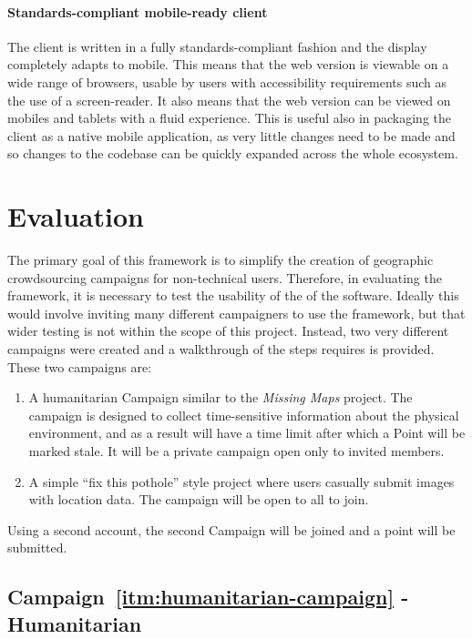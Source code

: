\documentclass{article}
\newcommand\ssection{\clearpage\section}
\begin{document}
	\paragraph{Standards-compliant mobile-ready client}
	The client is written in a fully standards-compliant fashion and the display completely adapts to mobile. This means that the web version is viewable on a wide range of browsers, usable by users with accessibility requirements such as the use of a screen-reader. It also means that the web version can be viewed on mobiles and tablets with a fluid experience. This is useful also in packaging the client as a native mobile application, as very little changes need to be made and so changes to the codebase can be quickly expanded across the whole ecosystem.

	\ssection{Evaluation}
	\label{sec:evaluation}

		The primary goal of this framework is to simplify the creation of geographic crowdsourcing campaigns for non-technical users. Therefore, in evaluating the framework, it is necessary to test the usability of the of the software. Ideally this would involve inviting many different campaigners to use the framework, but that wider testing is not within the scope of this project. Instead, two very different campaigns were created and a walkthrough of the steps requires is provided. These two campaigns are:

		\begin{enumerate}[label=\Alph*.]
			\item \label{itm:humanitarian-campaign} A humanitarian Campaign similar to the \emph{Missing Maps} project. The campaign is designed to collect time-sensitive information about the physical environment, and as a result will have a time limit after which a Point will be marked stale. It will be a private campaign open only to invited members.
			\item  \label{itm:pothole-campaign} A simple ``fix this pothole'' style project where users casually submit images with location data. The campaign will be open to all to join.
		\end{enumerate}

		Using a second account, the second Campaign will be joined and a point will be submitted.

		\subsection{Campaign~\ref{itm:humanitarian-campaign} - Humanitarian}
		\label{sec:humanitarian-campaign}
\end{document}
